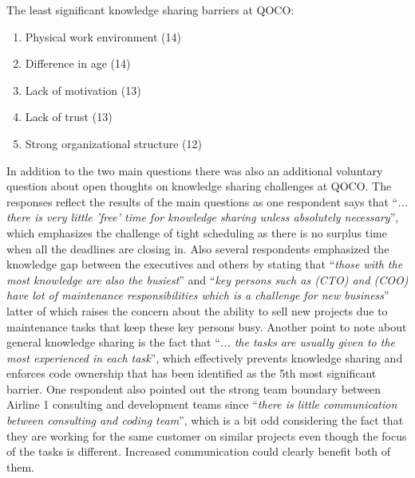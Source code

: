 \begin{center}
	The least significant knowledge sharing barriers at QOCO:

	\begin{enumerate}
		\centering
		\item Physical work environment (14)
		\item Difference in age (14)
		\item Lack of motivation (13)
		\item Lack of trust (13)
		\item Strong organizational structure (12)
	\end{enumerate}
\end{center}

In addition to the two main questions there was also an additional voluntary question about open thoughts on knowledge sharing challenges at QOCO. The responses reflect
the results of the main questions as one respondent says that ``\emph{... there is very little 'free' time for knowledge sharing unless absolutely necessary}'', which
emphasizes the challenge of tight scheduling as there is no surplus time when all the deadlines are closing in. Also several respondents emphasized the knowledge gap
between the executives and others by stating that ``\emph{those with the most knowledge are also the busiest}'' and
``\emph{key persons such as (CTO) and (COO) have lot of maintenance responsibilities which is a challenge for new business}'' latter of which raises the concern about
the ability to sell new projects due to maintenance tasks that keep these key persons busy. Another point to note about general knowledge sharing is the fact that
``\emph{... the tasks are usually given to the most experienced in each task}'', which effectively prevents knowledge sharing and enforces code ownership that has been
identified as the 5th most significant barrier. One respondent also pointed out the strong team boundary between Airline 1 consulting and development teams since
``\emph{there is little communication between consulting and coding team}'', which is a bit odd considering the fact that they are working for the same customer on similar
projects even though the focus of the tasks is different. Increased communication could clearly benefit both of them.

\vspace{12pt}



